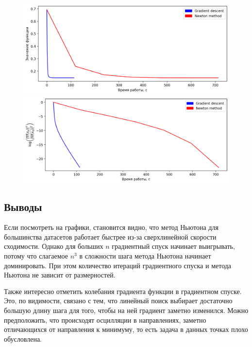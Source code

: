 \documentclass[notitlepage]{article}
\begin{document}
\begin{figure}[ht]
\begin{minipage}[t]{.5\textwidth}
  \centering
  \includegraphics[width=\textwidth, keepaspectratio]{plots/real-sim.bz2_plot_func.png}
\end{minipage}
\begin{minipage}[t]{.5\textwidth}
  \centering
  \includegraphics[width=\textwidth, keepaspectratio]{plots/real-sim.bz2_plot_grad.png}
\end{minipage}
\end{figure}

\subsection*{Выводы}
Если посмотреть на графики, становится видно, что метод Ньютона для большинства датасетов работает быстрее из-за сверхлинейной
скорости сходимости.
Однако для больших $n$ градиентный спуск начинает выигрывать, потому что
слагаемое $n^3$ в сложности шага метода Ньютона начинает доминировать.
При этом количество итераций градиентного спуска и метода Ньютона не зависит от размерностей.

Также интересно отметить колебания градиента функции в градиентном спуске.
Это, по видимости, связано с тем, что линейный поиск выбирает
достаточно большую длину шага для того, чтобы на ней градиент заметно изменился.
Можно предположить, что происходят осцилляции в направлениях, заметно отличающихся от направления к минимуму, то есть задача в данных точках плохо обусловлена.
\end{document}
